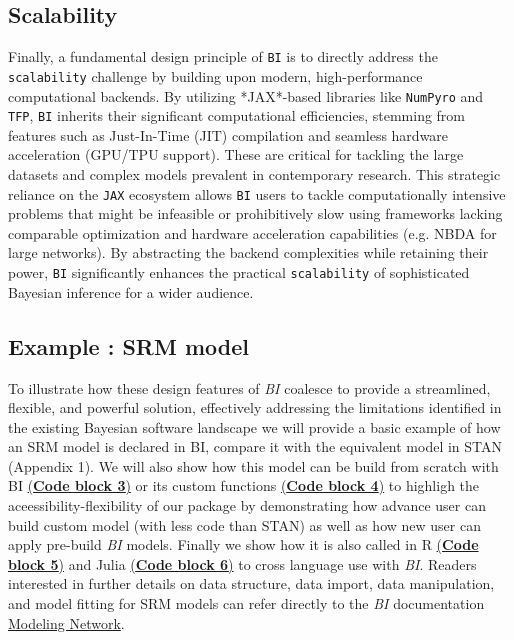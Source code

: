 \documentclass[num-refs]{wiley-article}
\begin{document}
\subsection{Scalability}\label{Scalability}
 Finally, a fundamental design principle of \texttt{BI} is to directly address the \texttt{scalability} challenge by building upon modern, high-performance computational backends. By utilizing *JAX*-based libraries like \texttt{NumPyro} and \texttt{TFP}, \texttt{BI} inherits their significant computational efficiencies, stemming from features such as Just-In-Time (JIT) compilation and seamless hardware acceleration (GPU/TPU support). These are critical for tackling the large datasets and complex models prevalent in contemporary research. This strategic reliance on the \texttt{JAX} ecosystem allows \texttt{BI} users to tackle computationally intensive problems that might be infeasible or prohibitively slow using frameworks lacking comparable optimization and hardware acceleration capabilities (e.g. NBDA for large networks). By abstracting the backend complexities while retaining their power, \texttt{BI} significantly enhances the practical \texttt{scalability} of sophisticated Bayesian inference for a wider audience.

\subsection{Example : SRM model}
To illustrate how these design features of \textit{BI} coalesce to provide a streamlined, flexible, and powerful solution, effectively addressing the limitations identified in the existing Bayesian software landscape we will provide a basic example of how an SRM model is declared in BI, compare it with the equivalent model in  STAN (Appendix 1). We will also show how this model can be build from scratch with BI \hyperref[code:block3_example]{(\textbf{Code block 3})} or its custom functions \hyperref[code:block4_example]{(\textbf{Code block 4})} to highligh the aceessibility-flexibility of our package by demonstrating how advance user can build custom model (with less code than STAN) as well as how new user can apply pre-build \textit{BI} models. Finally we show how it is also called in R \hyperref[code:block5_example]{(\textbf{Code block 5})} and Julia \hyperref[code:block6_example]{(\textbf{Code block 6})} to cross language use with \textit{BI}. Readers interested in further details on data structure, data import, data manipulation, and model fitting for SRM models can refer directly to the \textit{BI} documentation \href{https://s-sosa.com/BI/22.%20Network%20model.html}{Modeling Network}.
\end{document}
